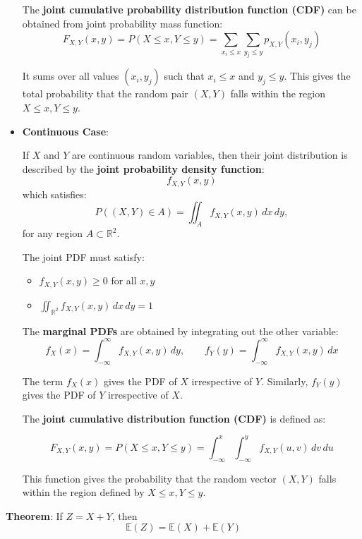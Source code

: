 \documentclass[twoside]{book}
\begin{document}
\begin{itemize}
The \textbf{joint cumulative probability distribution function (CDF)} can be obtained from joint probability mass function:
\[
F_{X,Y}(x, y) = P(X \leq x, Y \leq y) = \sum_{x_i \leq x} \sum_{y_j \leq y} p_{X,Y}(x_i, y_j)
\]

It sums over all values $(x_i,y_j)$ such that $x_i \leq x$ and $y_j \leq y$. This gives the total probability that the random pair \( (X, Y) \) falls within the region \( X \leq x, Y \leq y \).

\item \textbf{Continuous Case}:

If \( X \) and \( Y \) are continuous random variables, then their joint distribution is described by the \textbf{joint probability density function}:
\[
f_{X,Y}(x, y)
\]
which satisfies:
\[
P((X, Y) \in A) = \iint_{A} f_{X,Y}(x, y) \, dx \, dy,
\]
for any region \( A \subset \mathbb{R}^2 \).

The joint PDF must satisfy:
\begin{itemize}
  \item \( f_{X,Y}(x, y) \geq 0 \) for all \( x, y \)
  \item \( \iint_{\mathbb{R}^2} f_{X,Y}(x, y) \, dx \, dy = 1 \)
\end{itemize}

The \textbf{marginal PDFs} are obtained by integrating out the other variable:
\[
f_X(x) = \int_{-\infty}^{\infty} f_{X,Y}(x, y) \, dy, \qquad
f_Y(y) = \int_{-\infty}^{\infty} f_{X,Y}(x, y) \, dx
\]

The term $f_X(x)$ gives the PDF of $X$ irrespective of $Y$. Similarly, $f_Y(y)$ gives the PDF of $Y$ irrespective of $X$.

The \textbf{joint cumulative distribution function (CDF)} is defined as:

\[
F_{X,Y}(x, y) = P(X \leq x, Y \leq y) = \int_{-\infty}^{x} \int_{-\infty}^{y} f_{X,Y}(u, v) \, dv \, du
\]

This function gives the probability that the random vector \( (X, Y) \) falls within the region defined by \( X \leq x, Y \leq y \).
\end{itemize}

\begin{textbox}
\textbf{Theorem}: If \( Z = X + Y \), then  
\[
\mathbb{E}(Z) = \mathbb{E}(X) + \mathbb{E}(Y)
\]
\end{textbox}
\end{document}

